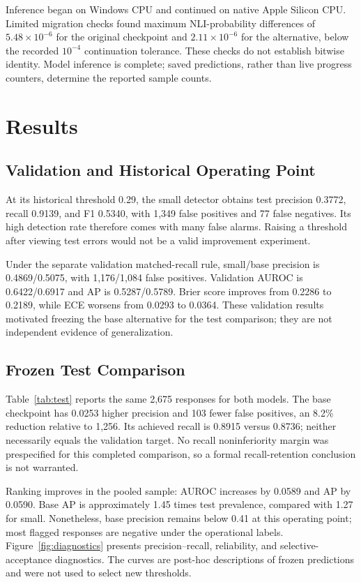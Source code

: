 \documentclass[conference,a4paper]{IEEEtran}
\begin{document}
Inference began on Windows CPU and continued on native Apple Silicon CPU. Limited migration checks found maximum NLI-probability differences of $5.48\times10^{-6}$ for the original checkpoint and $2.11\times10^{-6}$ for the alternative, below the recorded $10^{-4}$ continuation tolerance. These checks do not establish bitwise identity. Model inference is complete; saved predictions, rather than live progress counters, determine the reported sample counts.

\section{Results}
\subsection{Validation and Historical Operating Point}
At its historical threshold 0.29, the small detector obtains test precision 0.3772, recall 0.9139, and F1 0.5340, with 1,349 false positives and 77 false negatives. Its high detection rate therefore comes with many false alarms. Raising a threshold after viewing test errors would not be a valid improvement experiment.

Under the separate validation matched-recall rule, small/base precision is 0.4869/0.5075, with 1,176/1,084 false positives. Validation AUROC is 0.6422/0.6917 and AP is 0.5287/0.5789. Brier score improves from 0.2286 to 0.2189, while ECE worsens from 0.0293 to 0.0364. These validation results motivated freezing the base alternative for the test comparison; they are not independent evidence of generalization.

\subsection{Frozen Test Comparison}
Table~\ref{tab:test} reports the same 2,675 responses for both models. The base checkpoint has 0.0253 higher precision and 103 fewer false positives, an 8.2\% reduction relative to 1,256. Its achieved recall is 0.8915 versus 0.8736; neither necessarily equals the validation target. No recall noninferiority margin was prespecified for this completed comparison, so a formal recall-retention conclusion is not warranted.



Ranking improves in the pooled sample: AUROC increases by 0.0589 and AP by 0.0590. Base AP is approximately 1.45 times test prevalence, compared with 1.27 for small. Nonetheless, base precision remains below 0.41 at this operating point; most flagged responses are negative under the operational labels. Figure~\ref{fig:diagnostics} presents precision--recall, reliability, and selective-acceptance diagnostics. The curves are post-hoc descriptions of frozen predictions and were not used to select new thresholds.
\end{document}
